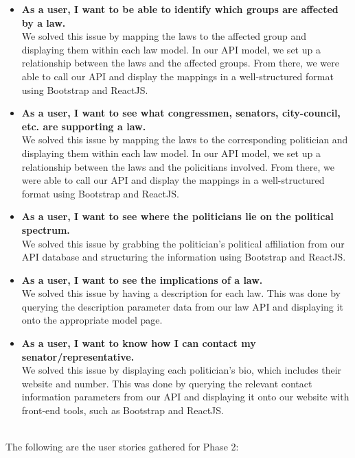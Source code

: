 \documentclass[12pt]{article}
\begin{document}
\begin{itemize}
	\item\textbf{As a user, I want to be able to identify which groups are affected by a law.} \\
	We solved this issue by mapping the laws to the affected group and displaying them within each law model. In our API model, we set up a relationship between the laws and the affected groups. From there, we were able to call our API and display the mappings in a well-structured format using Bootstrap and ReactJS.
	\\
	
	\item\textbf{As a user, I want to see what congressmen, senators, city-council, etc. are supporting a law.} \\
	We solved this issue by mapping the laws to the corresponding politician and displaying them within each law model. In our API model, we set up a relationship between the laws and the policitians involved. From there, we were able to call our API and display the mappings in a well-structured format using Bootstrap and ReactJS.
	\\
	
	\item\textbf{As a user, I want to see where the politicians lie on the political spectrum.} \\
	We solved this issue by grabbing the politician's political affiliation from our API database and structuring the information using Bootstrap and ReactJS.
	\\
	
	\item\textbf{As a user, I want to see the implications of a law.} \\
	We solved this issue by having a description for each law. This was done by querying the description parameter data from our law API and displaying it onto the appropriate model page. 
	\\
	
	\item\textbf{As a user, I want to know how I can contact my senator/representative.} \\
	We solved this issue by displaying each politician's bio, which includes their website and number. This was done by querying the relevant contact information parameters from our API and displaying it onto our website with front-end tools, such as Bootstrap and ReactJS.
	
\end{itemize} ~\\
The following are the user stories gathered for Phase 2: \vspace{0.5em}
	
\end{document}
